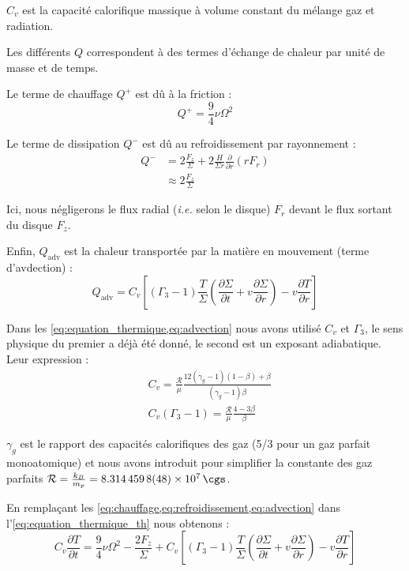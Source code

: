 $C_v$ est la capacité calorifique massique à volume constant du mélange gaz et
radiation.

Les différents $Q$ correspondent à des termes d’échange de chaleur par unité de
masse et de temps.

Le terme de chauffage $Q^+$ est dû à la friction :
\begin{equation}
    \label{eq:chauffage}
    Q^+ = \frac{9}{4} \nu \Omega^2
\end{equation}

Le terme de dissipation $Q^-$ est dû au refroidissement par rayonnement :
\begin{align}
    Q^- &= 2 \frac{F_z}{\Sigma} + 2 \frac{H}{\Sigma r} \frac{\partial}{\partial r} \left(r F_r\right) \\
    \label{eq:refroidissement}
        &\approx 2 \frac{F_z}{\Sigma}
\end{align}

Ici, nous négligerons le flux radial (\textit{i.e.} selon le disque) $F_r$
devant le flux sortant du disque $F_z$.

Enfin, $Q_\mathrm{adv}$ est la chaleur transportée par la matière en mouvement
(terme d’avdection) : 
\begin{equation}
    \label{eq:advection}
    Q_\mathrm{adv} = C_v \left[ (\Gamma_{3} - 1) \frac{T}{\Sigma} \left( \frac{\partial \Sigma}{\partial t} + v \frac{\partial \Sigma}{\partial r}  \right) - v \frac{\partial T}{\partial r} \right]
\end{equation}

Dans les \cref{eq:equation_thermique,eq:advection} nous avons utilisé $C_v$ et
$\Gamma_3$, le sens physique du premier a déjà été donné, le second est un
exposant adiabatique. Leur expression :
\begin{align}
    &C_v = \frac{\mathcal{R}}{\mu} \frac{12 (\gamma_g - 1)(1 - \beta) + \beta}{(\gamma_g - 1) \beta} \\
    &C_v (\Gamma_{3} - 1) = \frac{\mathcal{R}}{\mu} \frac{4 - 3\beta}{\beta}
\end{align}

$\gamma_g$ est le rapport des capacités calorifiques des gaz (5/3 pour un gaz
parfait monoatomique) et nous avons introduit pour simplifier la constante des
gaz parfaits $\mathcal{R} = \frac{k_B}{m_p} = \SI{8.3144598(48)d7}{\cgs}$.

En remplaçant les \cref{eq:chauffage,eq:refroidissement,eq:advection} dans
l’\cref{eq:equation_thermique_th} nous obtenons :
\begin{equation}
    \label{eq:equation_thermique}
    C_v \frac{\partial T}{\partial t} = \frac{9}{4} \nu \Omega^2 - \frac{2 F_z}{\Sigma} + C_v \left[ (\Gamma_{3} - 1) \frac{T}{\Sigma} \left( \frac{\partial \Sigma}{\partial t} + v \frac{\partial \Sigma}{\partial r} \right) - v \frac{\partial T}{\partial r} \right]
\end{equation}

